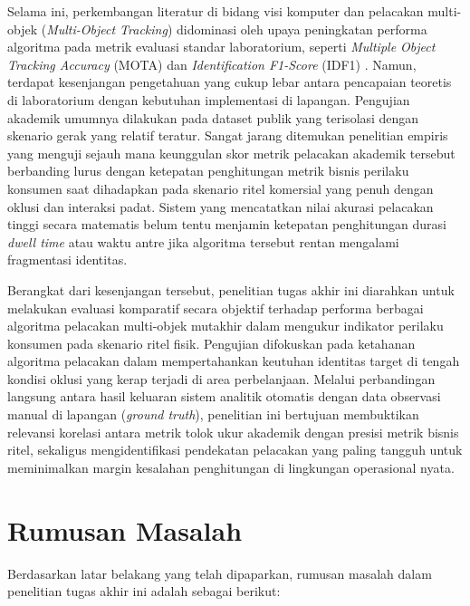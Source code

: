Selama ini, perkembangan literatur di bidang visi komputer dan pelacakan multi-objek (\textit{Multi-Object Tracking}) didominasi oleh upaya peningkatan performa algoritma pada metrik evaluasi standar laboratorium, seperti \textit{Multiple Object Tracking Accuracy} (MOTA) dan \textit{Identification F1-Score} (IDF1) \cite{bayraktar2025retrackvlm}. Namun, terdapat kesenjangan pengetahuan yang cukup lebar antara pencapaian teoretis di laboratorium dengan kebutuhan implementasi di lapangan. Pengujian akademik umumnya dilakukan pada dataset publik yang terisolasi dengan skenario gerak yang relatif teratur. Sangat jarang ditemukan penelitian empiris yang menguji sejauh mana keunggulan skor metrik pelacakan akademik tersebut berbanding lurus dengan ketepatan penghitungan metrik bisnis perilaku konsumen saat dihadapkan pada skenario ritel komersial yang penuh dengan oklusi dan interaksi padat. Sistem yang mencatatkan nilai akurasi pelacakan tinggi secara matematis belum tentu menjamin ketepatan penghitungan durasi \textit{dwell time} atau waktu antre jika algoritma tersebut rentan mengalami fragmentasi identitas.

Berangkat dari kesenjangan tersebut, penelitian tugas akhir ini diarahkan untuk melakukan evaluasi komparatif secara objektif terhadap performa berbagai algoritma pelacakan multi-objek mutakhir dalam mengukur indikator perilaku konsumen pada skenario ritel fisik. Pengujian difokuskan pada ketahanan algoritma pelacakan dalam mempertahankan keutuhan identitas target di tengah kondisi oklusi yang kerap terjadi di area perbelanjaan. Melalui perbandingan langsung antara hasil keluaran sistem analitik otomatis dengan data observasi manual di lapangan (\textit{ground truth}), penelitian ini bertujuan membuktikan relevansi korelasi antara metrik tolok ukur akademik dengan presisi metrik bisnis ritel, sekaligus mengidentifikasi pendekatan pelacakan yang paling tangguh untuk meminimalkan margin kesalahan penghitungan di lingkungan operasional nyata.


\section{Rumusan Masalah}

Berdasarkan latar belakang yang telah dipaparkan, rumusan masalah dalam penelitian tugas akhir ini adalah sebagai berikut:

